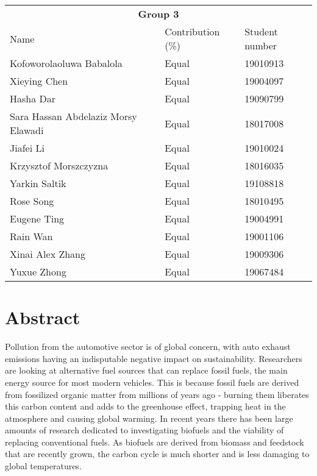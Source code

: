 \begin{table}[H]
    \begin{center}
        \begin{tabular}{@{}l l l@{}}
            \toprule
            \multicolumn{3}{c}{\textbf{Group 3}}                                     \\
            Name                                & Contribution (\%) & Student number \\
            \midrule
            Kofoworolaoluwa Babalola            & Equal             & 19010913       \\
            Xieying Chen                        & Equal             & 19004097       \\
            Hasha Dar                           & Equal             & 19090799       \\
            Sara Hassan Abdelaziz Morsy Elawadi & Equal             & 18017008       \\
            Jiafei Li                           & Equal             & 19010024       \\
            Krzysztof Morszczyzna               & Equal             & 18016035       \\
            Yarkin Saltik                       & Equal             & 19108818       \\
            Rose Song                           & Equal             & 18010495       \\
            Eugene Ting                         & Equal             & 19004991       \\
            Rain Wan                            & Equal             & 19001106       \\
            Xinai Alex Zhang                    & Equal             & 19009306       \\
            Yuxue Zhong                         & Equal             & 19067484       \\
            \bottomrule
        \end{tabular}
    \end{center}
\end{table}
\section{Abstract}
Pollution from the automotive sector is of global concern, with auto exhaust emissions having an indisputable negative impact on sustainability. Researchers are looking at alternative fuel sources that can replace fossil fuels, the main energy source for most modern vehicles. This is because fossil fuels are derived from fossilized organic matter from millions of years ago - burning them liberates this carbon content and adds to the greenhouse effect, trapping heat in the atmosphere and causing global warming. In recent years there has been large amounts of research dedicated to investigating biofuels and the viability of replacing conventional fuels. As biofuels are derived from biomass and feedstock that are recently grown, the carbon cycle is much shorter and is less damaging to global temperatures.

